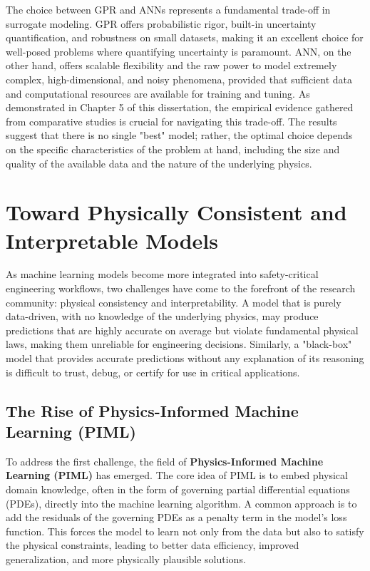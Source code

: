 The choice between GPR and ANNs represents a fundamental trade-off in surrogate modeling. GPR offers probabilistic rigor, built-in uncertainty quantification, and robustness on small datasets, making it an excellent choice for well-posed problems where quantifying uncertainty is paramount. ANN, on the other hand, offers scalable flexibility and the raw power to model extremely complex, high-dimensional, and noisy phenomena, provided that sufficient data and computational resources are available for training and tuning. As demonstrated in Chapter 5 of this dissertation, the empirical evidence gathered from comparative studies is crucial for navigating this trade-off. The results suggest that there is no single "best" model; rather, the optimal choice depends on the specific characteristics of the problem at hand, including the size and quality of the available data and the nature of the underlying physics.

\section{Toward Physically Consistent and Interpretable Models}

As machine learning models become more integrated into safety-critical engineering workflows, two challenges have come to the forefront of the research community: physical consistency and interpretability. A model that is purely data-driven, with no knowledge of the underlying physics, may produce predictions that are highly accurate on average but violate fundamental physical laws, making them unreliable for engineering decisions. Similarly, a "black-box" model that provides accurate predictions without any explanation of its reasoning is difficult to trust, debug, or certify for use in critical applications.


\subsection{The Rise of Physics-Informed Machine Learning (PIML)}

To address the first challenge, the field of \textbf{Physics-Informed Machine Learning (PIML)} has emerged. The core idea of PIML is to embed physical domain knowledge, often in the form of governing partial differential equations (PDEs), directly into the machine learning algorithm. A common approach is to add the residuals of the governing PDEs as a penalty term in the model's loss function. This forces the model to learn not only from the data but also to satisfy the physical constraints, leading to better data efficiency, improved generalization, and more physically plausible solutions.

